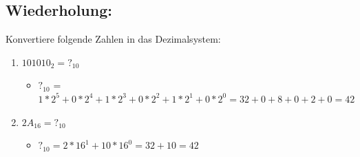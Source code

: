 \documentclass{article}
\begin{document}
	\subsection{Wiederholung:}
	Konvertiere folgende Zahlen in das Dezimalsystem: \\
	\begin{enumerate}
		\item{$101010_2 = ?_{10}$}
		\begin{itemize}
			\item{$?_{10}$ = $1*2^5 + 0*2^4 + 1*2^3 + 0*2^2 + 1*2^1 + 0*2^0 = 32 + 0 + 8 + 0 + 2 + 0 = 42$}
		\end{itemize}
		\item{$2A_{16} = ?_{10}$}
		\begin{itemize}
			\item{$?_{10} = 2*16^1 + 10*16^0 = 32 + 10 = 42$}
		\end{itemize}
	\end{enumerate}
\end{document}
